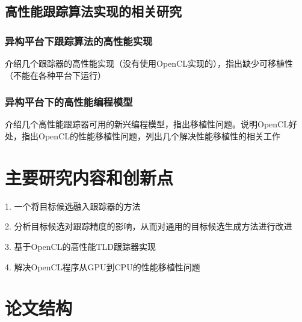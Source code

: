 \subsection{高性能跟踪算法实现的相关研究}

\subsubsection{异构平台下跟踪算法的高性能实现}
介绍几个跟踪器的高性能实现（没有使用OpenCL实现的），指出缺少可移植性（不能在各种平台下运行）

\subsubsection{异构平台下的高性能编程模型}
介绍几个高性能跟踪器可用的新兴编程模型，指出移植性问题。说明OpenCL好处，指出OpenCL的性能移植性问题，列出几个解决性能移植性的相关工作


\section{主要研究内容和创新点}
1. 一个将目标候选融入跟踪器的方法

2. 分析目标候选对跟踪精度的影响，从而对通用的目标候选生成方法进行改进

3. 基于OpenCL的高性能TLD跟踪器实现

4. 解决OpenCL程序从GPU到CPU的性能移植性问题

\section{论文结构}